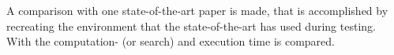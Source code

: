 A comparison with one state-of-the-art paper is made, that is accomplished by recreating the environment that the state-of-the-art has used during testing. With \citeauthor{wang_affordancebased_2020} the computation- (or search) and execution time is compared.\bs







